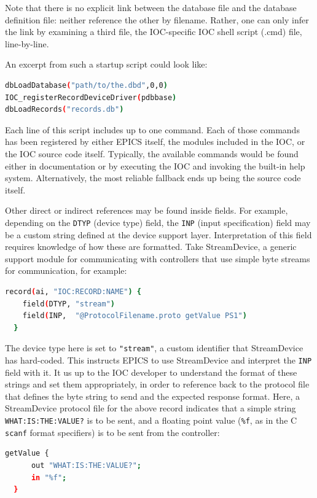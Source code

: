\documentclass[letter,
               keeplastbox,   %
               ]{jacow}
\begin{document}
Note that there is no explicit link between the database file and the database
definition file: neither reference the other by filename.
Rather, one can only infer the link by examining a third file, the IOC-specific
IOC shell script (.cmd) file, line-by-line.

An excerpt from such a startup script could look like:
\begin{lstlisting}[language=bash]
dbLoadDatabase("path/to/the.dbd",0,0)
IOC_registerRecordDeviceDriver(pdbbase) 
dbLoadRecords("records.db")
\end{lstlisting}

Each line of this script includes up to one command. Each of those commands
has been registered by either EPICS itself, the modules included in the IOC,
or the IOC source code itself.  Typically, the available commands
would be found either in documentation or by executing the IOC and invoking the
built-in help system. Alternatively, the most reliable fallback ends up
being the source code itself.

Other direct or indirect references may be found inside fields.  
For example, depending on the \verb_DTYP_ (device type) field, the \verb_INP_
(input specification) field may be a custom string defined at the device
support layer. Interpretation of this field requires knowledge of how
these are formatted.  Take StreamDevice\cite{streamdevice}, a generic
support module for communicating with controllers that use simple byte
streams for communication, for example:
\begin{lstlisting}[language=bash]
  record(ai, "IOC:RECORD:NAME") {
    field(DTYP, "stream")
    field(INP,  "@ProtocolFilename.proto getValue PS1")
  }
\end{lstlisting}
The device type here is set to \verb_"stream"_, a custom identifier that
StreamDevice has hard-coded.  This instructs EPICS to use StreamDevice
and interpret the \verb_INP_ field with it.  It us up to the IOC developer to
understand the format of these strings and set them appropriately, in order
to reference back to the protocol file that defines the byte string to send
and the expected response format. Here, a StreamDevice protocol file for
the above record indicates that a simple string \verb_WHAT:IS:THE:VALUE?_
is to be sent, and a floating point value (\verb_%f_, as in the C \verb_scanf_
format specifiers) is to be sent from the controller:
\begin{lstlisting}[language=bash]
  getValue {
      out "WHAT:IS:THE:VALUE?";
      in "%f";
  }
\end{lstlisting}
\end{document}

